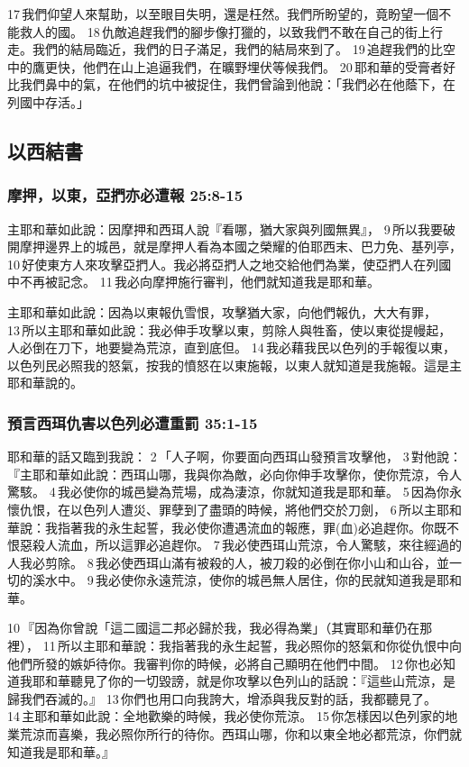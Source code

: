 17 我們仰望人來幫助，以至眼目失明，還是枉然。我們所盼望的，竟盼望一個不能救人的國。 18 仇敵追趕我們的腳步像打獵的，以致我們不敢在自己的街上行走。我們的結局臨近，我們的日子滿足，我們的結局來到了。 19 追趕我們的比空中的鷹更快，他們在山上追逼我們，在曠野埋伏等候我們。 20 耶和華的受膏者好比我們鼻中的氣，在他們的坑中被捉住，我們曾論到他說：「我們必在他蔭下，在列國中存活。」

\subsection{以西結書}
\subsubsection{摩押，以東，亞捫亦必遭報 25:8-15}
主耶和華如此說：因摩押和西珥人說『看哪，猶大家與列國無異』， 9 所以我要破開摩押邊界上的城邑，就是摩押人看為本國之榮耀的伯耶西末、巴力免、基列亭， 10 好使東方人來攻擊亞捫人。我必將亞捫人之地交給他們為業，使亞捫人在列國中不再被記念。 11 我必向摩押施行審判，他們就知道我是耶和華。

主耶和華如此說：因為以東報仇雪恨，攻擊猶大家，向他們報仇，大大有罪， 13 所以主耶和華如此說：我必伸手攻擊以東，剪除人與牲畜，使以東從提幔起，人必倒在刀下，地要變為荒涼，直到底但。 14 我必藉我民以色列的手報復以東，以色列民必照我的怒氣，按我的憤怒在以東施報，以東人就知道是我施報。這是主耶和華說的。

\subsubsection{預言西珥仇害以色列必遭重罰 35:1-15}
耶和華的話又臨到我說： 2 「人子啊，你要面向西珥山發預言攻擊他， 3 對他說：『主耶和華如此說：西珥山哪，我與你為敵，必向你伸手攻擊你，使你荒涼，令人驚駭。 4 我必使你的城邑變為荒場，成為淒涼，你就知道我是耶和華。 5 因為你永懷仇恨，在以色列人遭災、罪孽到了盡頭的時候，將他們交於刀劍， 6 所以主耶和華說：我指著我的永生起誓，我必使你遭遇流血的報應，罪(血)必追趕你。你既不恨惡殺人流血，所以這罪必追趕你。 7 我必使西珥山荒涼，令人驚駭，來往經過的人我必剪除。 8 我必使西珥山滿有被殺的人，被刀殺的必倒在你小山和山谷，並一切的溪水中。 9 我必使你永遠荒涼，使你的城邑無人居住，你的民就知道我是耶和華。

10 『因為你曾說「這二國這二邦必歸於我，我必得為業」（其實耶和華仍在那裡）， 11 所以主耶和華說：我指著我的永生起誓，我必照你的怒氣和你從仇恨中向他們所發的嫉妒待你。我審判你的時候，必將自己顯明在他們中間。 12 你也必知道我耶和華聽見了你的一切毀謗，就是你攻擊以色列山的話說：『這些山荒涼，是歸我們吞滅的。』 13 你們也用口向我誇大，增添與我反對的話，我都聽見了。 14 主耶和華如此說：全地歡樂的時候，我必使你荒涼。 15 你怎樣因以色列家的地業荒涼而喜樂，我必照你所行的待你。西珥山哪，你和以東全地必都荒涼，你們就知道我是耶和華。』

